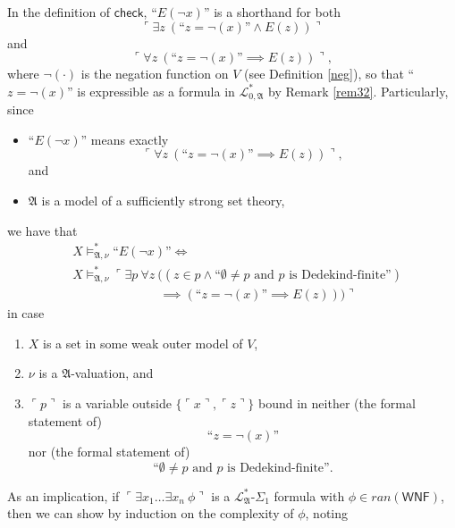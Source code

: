 \documentclass[12pt]{article}
\numberwithin{equation}{section}
\begin{document}
\begin{rem}\label{shcs}
In the definition of $\mathsf{check}$, $\text{``} E(\neg x) \text{''}$ is a shorthand for both $$\ulcorner \exists z \ (\text{``} z = \neg (x) \text{''} \wedge E(z)) \urcorner$$ and $$\ulcorner \forall z \ (\text{``} z = \neg (x) \text{''} \implies E(z)) \urcorner,$$ where $\neg (\cdot)$ is the negation function on $V$ (see Definition \ref{neg}), so that ``$z = \neg (x)$'' is expressible as a formula in $\mathcal{L}^{*}_{0, \mathfrak{A}}$ by Remark \ref{rem32}. Particularly, since 
\begin{itemize}
    \item $\text{``} E(\neg x) \text{''}$ means exactly $$\ulcorner \forall z \ (\text{``} z = \neg (x) \text{''} \implies E(z)) \urcorner,$$ and
    \item $\mathfrak{A}$ is a model of a sufficiently strong set theory,
\end{itemize} 
we have that
\begin{align*}
    & X \models^*_{\mathfrak{A}, \nu} \text{``} E(\neg x) \text{''} \iff \\
    & X \models^*_{\mathfrak{A}, \nu} \ulcorner \exists p \ \forall z \ ((z \in p \wedge \text{``}\emptyset \neq p \text{ and } p \text{ is Dedekind-finite''}) \\
    & \mspace{125mu} \implies (\text{``} z = \neg (x) \text{''} \implies E(z))) \urcorner
\end{align*}
in case 
\begin{enumerate}[label=(\alph*)]
    \item $X$ is a set in some weak outer model of $V$,
    \item $\nu$ is a $\mathfrak{A}$-valuation, and
    \item $\ulcorner p \urcorner$ is a variable outside $\{\ulcorner x \urcorner, \ulcorner z \urcorner\}$ bound in neither (the formal statement of)
    \begin{equation*}
        \text{``} z = \neg (x) \text{''}
    \end{equation*}
    nor (the formal statement of)
    \begin{equation*}
        \text{``}\emptyset \neq p \text{ and } p \text{ is Dedekind-finite''.}
    \end{equation*}
\end{enumerate} 
As an implication, if $\ulcorner \exists x_1 \dots \exists x_n \ \phi \urcorner$ is a $\mathcal{L}^{*}_{\mathfrak{A}}$-$\Sigma_1$ formula with $\phi \in ran(\mathsf{WNF})$, then we can show by induction on the complexity of $\phi$, noting

\end{rem}
\end{document}
